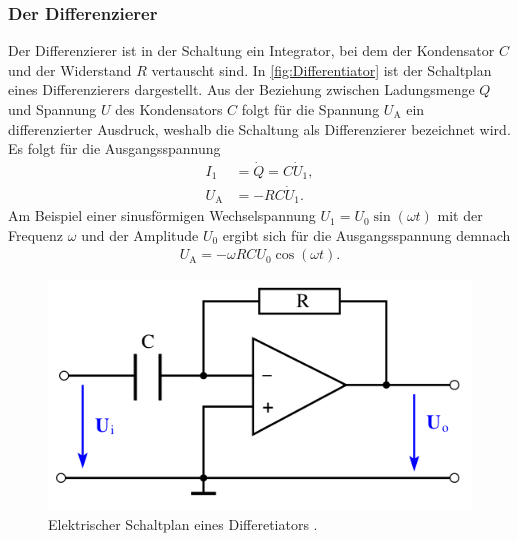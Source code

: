 \subsubsection{Der Differenzierer}\label{subsubsec:Differenzierer}        %
Der Differenzierer ist in der Schaltung ein Integrator, bei dem der Kondensator $C$ und der Widerstand $R$ vertauscht sind.
In \autoref{fig:Differentiator} ist der Schaltplan eines Differenzierers dargestellt.
Aus der Beziehung zwischen Ladungsmenge $Q$ und Spannung $U$ des Kondensators $C$ folgt für die Spannung $U_\text{A}$ ein differenzierter Ausdruck, weshalb die Schaltung als Differenzierer bezeichnet wird.
Es folgt für die Ausgangsspannung
\begin{align}
    I_1 &= \dot Q = C\dot U_1, \\
    U_\text{A} &= -RC\dot U_1.
\end{align}
Am Beispiel einer sinusförmigen Wechselspannung $U_1=U_0\sin(\omega t)$ mit der Frequenz $\omega$ und der Amplitude $U_0$ ergibt sich für die Ausgangsspannung demnach
\begin{align}
    U_\text{A} = -\omega RCU_0\cos(\omega t).
\end{align}
\begin{figure}[H]
	\centering
    \includegraphics[width=0.6\linewidth]{figures/Differentiator.png}
	\caption{Elektrischer Schaltplan eines Differetiators \cite{Anleitung51}.}
	\label{fig:Differentiator}
\end{figure}


